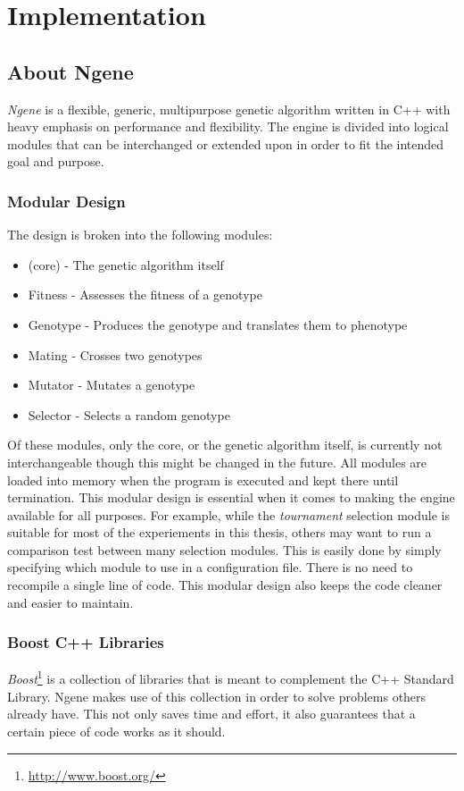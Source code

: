 \section{Implementation}

\subsection{About Ngene}
\emph{Ngene} is a flexible, generic, multipurpose genetic algorithm written in C++ with heavy emphasis on performance and flexibility. The engine is divided into logical modules that can be interchanged or extended upon in order to fit the intended goal and purpose.

\subsubsection{Modular Design}
The design is broken into the following modules:

\begin{itemize}
	\item (core) - The genetic algorithm itself
	\item Fitness - Assesses the fitness of a genotype
	\item Genotype - Produces the genotype and translates them to phenotype
	\item Mating - Crosses two genotypes
	\item Mutator - Mutates a genotype
	\item Selector - Selects a random genotype
\end{itemize}

Of these modules, only the core, or the genetic algorithm itself, is currently not interchangeable though this might be changed in the future. All modules are loaded into memory when the program is executed and kept there until termination. This modular design is essential when it comes to making the engine available for all purposes. For example, while the \emph{tournament} selection module is suitable for most of the experiements in this thesis, others may want to run a comparison test between many selection modules. This is easily done by simply specifying which module to use in a configuration file. There is no need to recompile a single line of code. This modular design also keeps the code cleaner and easier to maintain.

\subsubsection{Boost C++ Libraries}
\emph{Boost}\footnote{\url{http://www.boost.org/}} is a collection of libraries that is meant to complement the C++ Standard Library. Ngene makes use of this collection in order to solve problems others already have. This not only saves time and effort, it also guarantees that a certain piece of code works as it should.

